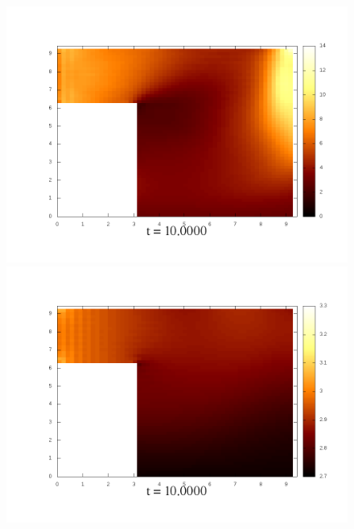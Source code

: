\documentclass[a4paper, 12pt]{article}
\begin{document}
\begin{figure}[h]
	\begin{minipage}[h]{0.4\linewidth}
		\includegraphics[width=1\linewidth]{./img/01_1_1/G/50}
	\end{minipage}
	\hfill
	\begin{minipage}[h]{0.4\linewidth}
		\includegraphics[width=1\linewidth]{./img/01_1_01/G/50}
	\end{minipage}
\end{figure}
\end{document}
